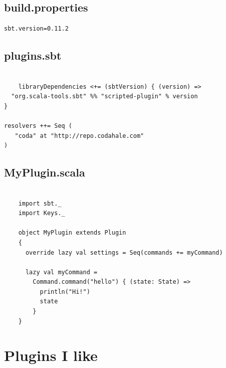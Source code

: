 \documentclass[utf8]{beamer}
\begin{document}
\subsection{build.properties}
\begin{frame}[fragile]

  \begin{lstlisting}[title={project/build.properties}]
    sbt.version=0.11.2
  \end{lstlisting}

\end{frame}

\subsection{plugins.sbt}
\begin{frame}[fragile]
  \begin{lstlisting}[title={project/plugins.sbt}]
    
    libraryDependencies <+= (sbtVersion) { (version) =>
  "org.scala-tools.sbt" %% "scripted-plugin" % version
}

resolvers ++= Seq (
   "coda" at "http://repo.codahale.com"
)
  \end{lstlisting}

\end{frame}

\subsection{MyPlugin.scala}
\begin{frame}[fragile]
  \begin{lstlisting}[title={src/main/scala/MyPlugin.scala}]

    import sbt._
    import Keys._

    object MyPlugin extends Plugin
    {
      override lazy val settings = Seq(commands += myCommand)

      lazy val myCommand = 
        Command.command("hello") { (state: State) =>
          println("Hi!")
          state
        }
    }
  \end{lstlisting}

\end{frame}

\section{Plugins I like}
\frame{\tableofcontents[currentsection]}
\end{document}
